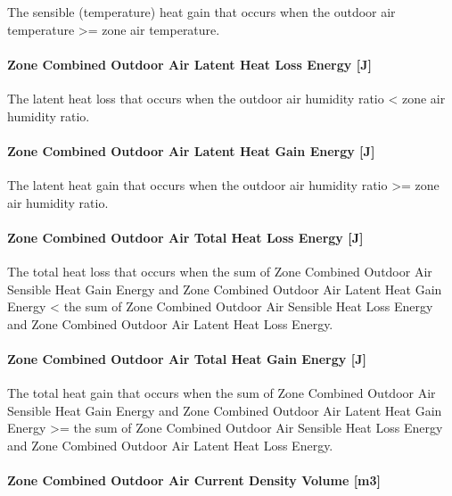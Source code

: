 The sensible (temperature) heat gain that occurs when the outdoor air temperature \textgreater{}= zone air temperature.

\paragraph{Zone Combined Outdoor Air Latent Heat Loss Energy {[}J{]}}\label{zone-combined-outdoor-air-latent-heat-loss-energy-j}

The latent heat loss that occurs when the outdoor air humidity ratio \textless{} zone air humidity ratio.

\paragraph{Zone Combined Outdoor Air Latent Heat Gain Energy {[}J{]}}\label{zone-combined-outdoor-air-latent-heat-gain-energy-j}

The latent heat gain that occurs when the outdoor air humidity ratio \textgreater{}= zone air humidity ratio.

\paragraph{Zone Combined Outdoor Air Total Heat Loss Energy {[}J{]}}\label{zone-combined-outdoor-air-total-heat-loss-energy-j}

The total heat loss that occurs when the sum of Zone Combined Outdoor Air Sensible Heat Gain Energy and Zone Combined Outdoor Air Latent Heat Gain Energy \textless{} the sum of Zone Combined Outdoor Air Sensible Heat Loss Energy and Zone Combined Outdoor Air Latent Heat Loss Energy.

\paragraph{Zone Combined Outdoor Air Total Heat Gain Energy {[}J{]}}\label{zone-combined-outdoor-air-total-heat-gain-energy-j}

The total heat gain that occurs when the sum of Zone Combined Outdoor Air Sensible Heat Gain Energy and Zone Combined Outdoor Air Latent Heat Gain Energy \textgreater{}= the sum of Zone Combined Outdoor Air Sensible Heat Loss Energy and Zone Combined Outdoor Air Latent Heat Loss Energy.

\paragraph{Zone Combined Outdoor Air Current Density Volume {[}m3{]}}\label{zone-combined-outdoor-air-current-density-volume-m3}

